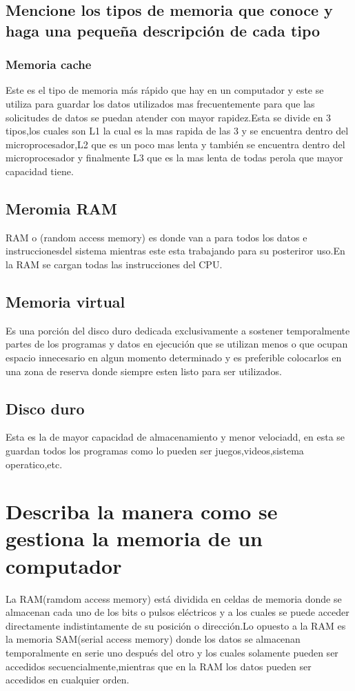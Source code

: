 \documentclass{article}
\begin{document}
\subsection{Mencione los tipos de memoria que conoce y haga una pequeña descripción de cada tipo}


\subsubsection{Memoria cache}
Este es el tipo de memoria más rápido que hay en un computador y este se utiliza para guardar los datos utilizados mas frecuentemente para que las solicitudes de datos se puedan atender con mayor rapidez.Esta se divide en 3 tipos,los cuales son L1 la cual es la mas rapida de las 3 y se encuentra dentro del microprocesador,L2 que es un poco mas lenta y también se encuentra dentro del microprocesador y finalmente L3 que es la mas lenta de todas perola que mayor capacidad tiene.


\subsection{Meromia RAM}
RAM o (random access memory) es donde van a para todos los datos e instruccionesdel sistema mientras este esta trabajando para su posteriror uso.En la RAM se cargan todas las instrucciones del CPU.


\subsection{Memoria virtual}
Es una porción del disco duro dedicada exclusivamente a sostener temporalmente partes de los programas y datos en ejecución que se utilizan menos o que ocupan espacio innecesario en algun momento determinado y es preferible colocarlos en una zona de reserva donde siempre esten listo para ser utilizados.

\subsection{Disco duro}
Esta es la de mayor capacidad de almacenamiento y menor velociadd, en esta se guardan todos los programas como lo pueden ser juegos,videos,sistema operatico,etc.






\section{Describa la manera como se gestiona la memoria de un computador} 
La RAM(ramdom access memory) está dividida en celdas de memoria donde se almacenan cada uno de los bits o pulsos eléctricos y a los cuales se puede acceder directamente indistintamente de su posición o dirección.Lo opuesto a la RAM es la memoria SAM(serial access memory) donde los datos se almacenan temporalmente en serie uno después del otro y los cuales solamente pueden ser accedidos secuencialmente,mientras que en la RAM los datos pueden ser accedidos en cualquier orden.
\end{document}
